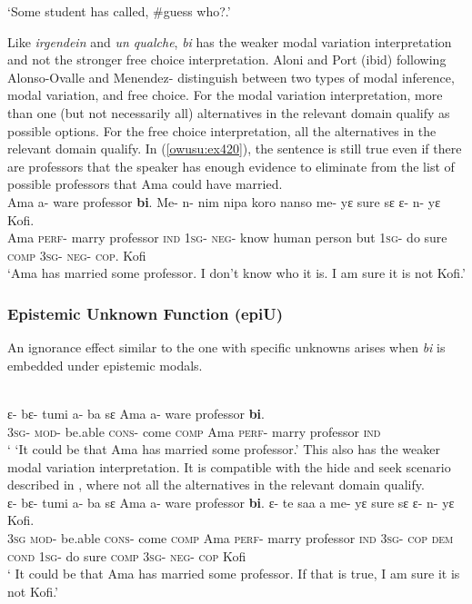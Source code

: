 \documentclass[output=paper,modfonts,nonflat,draftmode]{langsci/langscibook}
\begin{document}
\glt `Some student has called, \#guess who?.' 
\z \z

Like \emph{irgendein} and \emph{un qualche}, \emph{bi} has the weaker modal variation interpretation and not the stronger free choice interpretation. Aloni and Port (ibid) following Alonso-Ovalle and Menendez-\citet{Benito2010} distinguish between two types of modal inference, modal variation, and free choice. 
For the modal variation interpretation, more than one (but not necessarily all) alternatives in the relevant domain qualify as possible options. For the free choice interpretation, all the alternatives in the relevant domain qualify. In (\ref{owusu:ex420}), the sentence is still true even if there are professors that the speaker has enough evidence to eliminate from the list of possible professors that Ama could have married.
\ea\label{owusu:ex420}\\
 \gll  Ama a- ware professor \textbf{bi}. Me- n- nim nipa koro nanso me- yε sure sε ε- n- yε Kofi.\\
Ama \textsc{perf}- marry professor \textsc{ind} \textsc{1sg}- \textsc{neg}- know human person but \textsc{1sg}- do sure \textsc{comp}  \textsc{3sg}- \textsc{neg}- \textsc{cop}. Kofi \\
    
\glt `Ama has married some professor. I don't know who it is. I am sure it is not Kofi.' 
\z 

\subsubsection{Epistemic Unknown Function (epiU)}
An ignorance effect similar to the one with specific unknowns arises when \emph{bi} is embedded under epistemic modals.

\ea\label{owusu:ex42}\\
 \gll  ε- bε- tumi a- ba sε Ama a- ware professor \textbf{bi}. 
\\
\textsc{3sg}- \textsc{mod}- be.able \textsc{cons}- come \textsc{comp} Ama \textsc{perf}- marry professor \textsc{ind} \\
    
\glt ` `It could be that Ama has married some professor.' 
\z 
This also has the weaker modal variation interpretation. It is compatible with the hide and seek scenario described in \citet{AloniPort2015}, where not all the alternatives in the relevant domain qualify.
\ea\label{owusu:ex42}\\
 \gll  ε- bε- tumi a- ba sε Ama a- ware professor \textbf{bi}. ε- te saa a  me- yε sure sε ε- n- yε Kofi. \\
\textsc{3sg} 
 \textsc{mod}- be.able \textsc{cons}- come \textsc{comp} Ama \textsc{perf}- marry professor \textsc{ind} \textsc{3sg}- \textsc{cop} \textsc{dem} \textsc{cond} \textsc{1sg}- do sure \textsc{comp}  \textsc{3sg}- \textsc{neg}- \textsc{cop} Kofi\\
\glt ` It could be that Ama has married some professor. If that is true, I am sure it is not Kofi.' 
\z 
\end{document}
